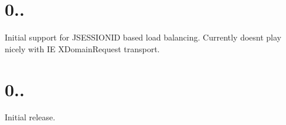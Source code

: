 \section*{0.. }


\begin{DoxyItemize}
\item Initial support for J\+S\+E\+S\+S\+I\+O\+N\+ID based load balancing. Currently doesn\textquotesingle{}t play nicely with IE X\+Domain\+Request transport.
\end{DoxyItemize}

\section*{0.. }


\begin{DoxyItemize}
\item Initial release. 
\end{DoxyItemize}